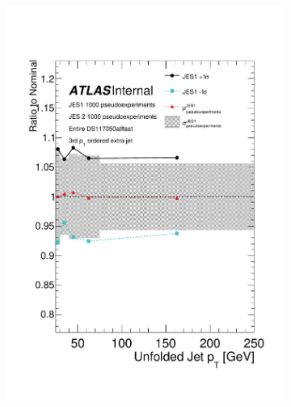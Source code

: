 \begin{figure}
\begin{subfigure}[]{0.45\textwidth}
\includegraphics[width=\textwidth]{fig/UnfoldSys/Toy/JES1VarBandRatioJet2.pdf}
\end{subfigure}
\begin{subfigure}[]{0.45\textwidth}

\end{subfigure}
\end{figure}
